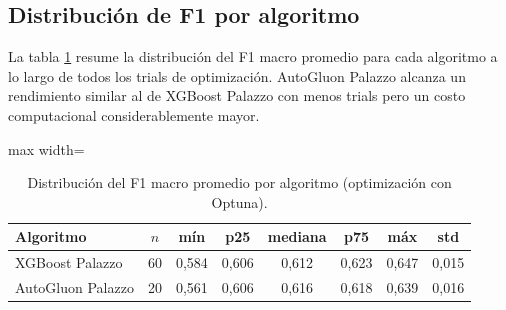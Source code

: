 \subsection{Distribución de F1 por algoritmo}

La tabla \ref{tab:ml_f1_dist} resume la distribución del F1 macro promedio para cada algoritmo a lo largo de todos los trials de optimización. AutoGluon Palazzo alcanza un rendimiento similar al de XGBoost Palazzo con menos trials pero un costo computacional considerablemente mayor.

\begin{table}[H]
    \centering
    \caption[Distribución F1 ML]{Distribución del F1 macro promedio por algoritmo (optimización con Optuna).}
    \small
    \begin{adjustbox}{max width=\textwidth}
    \begin{tabular}{l c c c c c c c}
        \toprule
        \textbf{Algoritmo} & \textbf{$n$} & \textbf{mín} & \textbf{p25} & \textbf{mediana} & \textbf{p75} & \textbf{máx} & \textbf{std} \\
        \midrule
        XGBoost Palazzo  & 60 & 0,584 & 0,606 & 0,612 & 0,623 & 0,647 & 0,015 \\
        AutoGluon Palazzo & 20 & 0,561 & 0,606 & 0,616 & 0,618 & 0,639 & 0,016 \\
        \bottomrule
    \end{tabular}
    \end{adjustbox}
    \label{tab:ml_f1_dist}
\end{table}

